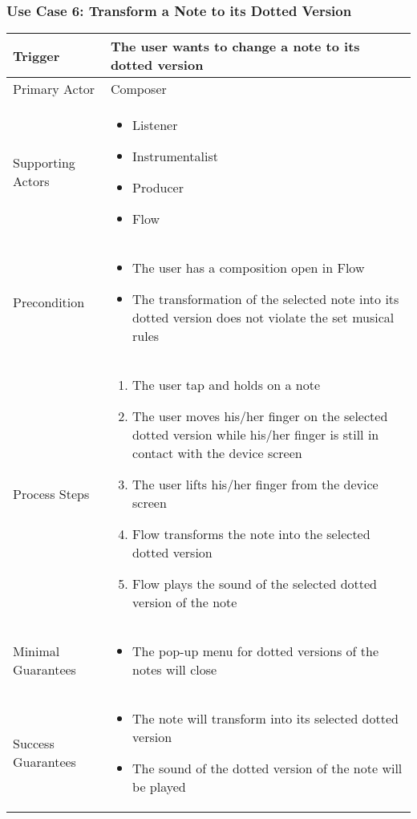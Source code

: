 \subsubsection{Use Case 6: Transform a Note to its Dotted Version}

\begin{tabularx}{\textwidth}{|X|X|}
\hline
Trigger & 
The user wants to change a note to its dotted version \\
\hline
Primary Actor & 
Composer \\
\hline
Supporting Actors & 
\begin{itemize}
\item Listener
\item Instrumentalist
\item Producer
\item Flow
\end{itemize} \\
\hline
Precondition & 
\begin{itemize}
\item The user has a composition open in Flow
\item The transformation of the selected note into its dotted version does not violate the set musical rules
\end{itemize} \\
\hline
Process Steps & 
\begin{enumerate}
\item The user tap and holds on a note
\item The user moves his/her finger on the selected dotted version while his/her finger is still in contact with the device screen
\item The user lifts his/her finger from the device screen
\item Flow transforms the note into the selected dotted version
\item Flow plays the sound of the selected dotted version of the note
\end{enumerate} \\
\hline
Minimal Guarantees & 
\begin{itemize}
  \item The pop-up menu for dotted versions of the notes will close
\end{itemize} \\
\hline
Success Guarantees & 
\begin{itemize}
  \item The note will transform into its selected dotted version
  \item The sound of the dotted version of the note will be played 
\end{itemize} \\
\hline
\end{tabularx}

